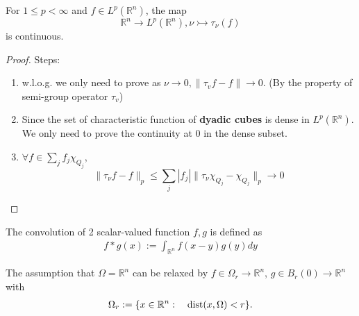 \begin{theorem}
For $1 \leq p < \infty$ and $f \in L^p(\mathbb{R}^n)$, the map
\begin{equation*}
	\mathbb{R}^n \rightarrow L^p(\mathbb{R}^n), \nu \rightarrowtail \tau_\nu(f)
\end{equation*}
is continuous.
\end{theorem}
\begin{proof}
	Steps:
	\begin{enumerate}
		\item w.l.o.g. we only need to prove as $\nu \rightarrow 0, \|\tau_v f - f\| \rightarrow 0$. (By the property of semi-group operator $\tau_v$)
		\item Since the set of characteristic function of  \textbf{dyadic cubes} is dense in $L^p(\mathbb{R}^n)$. We only need to prove the continuity at 0 in the dense subset. 
		\item $\forall f \in \sum_j f_j \chi_{Q_j}$, 
			\begin{equation*}
				\|\tau_\nu f - f\|_p \leq \sum_j |f_j| \| \tau_\nu  \chi_{Q_j} - \chi_{Q_j}\|_p \rightarrow 0
			\end{equation*}
	\end{enumerate}
\end{proof}

\begin{definition}[Convolution]
	The convolution of 2 scalar-valued function $f, g$ is defined as 
	\begin{align*}
		f*g(x) := \int_{\mathbb{R}^n}f(x-y)g(y)dy
	\end{align*}
\end{definition}
\begin{remark}
The assumption that $\Omega = \mathbb{R}^n$ can be relaxed by $f \in \Omega_r \rightarrow \mathbb{R}^n$, $g \in B_r(0) \rightarrow \mathbb{R}^n$ with 
\begin{align*}
	\Omega_r:= \{ x \in \mathbb{R}^n:\quad \operatorname*{dist}(x, \Omega) < r \}. 
\end{align*}	
\end{remark}

